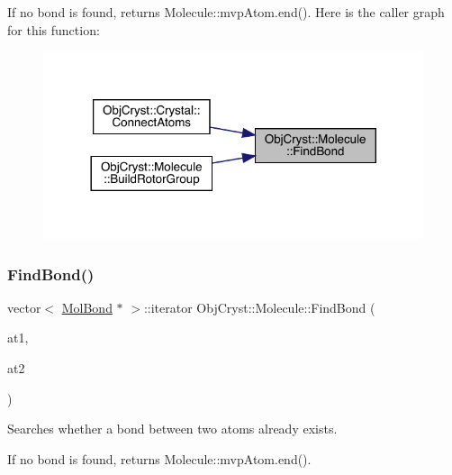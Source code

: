 If no bond is found, returns Molecule\+::mvp\+Atom.\+end(). Here is the caller graph for this function\+:
\nopagebreak
\begin{figure}[H]
\begin{center}
\leavevmode
\includegraphics[width=317pt]{class_obj_cryst_1_1_molecule_a78cdfa9c0223f1f45d5aac3b0e0d4989_icgraph}
\end{center}
\end{figure}
\mbox{\label{class_obj_cryst_1_1_molecule_a44ab98d43be98b63297c0059a73e07ad}} 
\subsubsection{\texorpdfstring{FindBond()}{FindBond()}\hspace{0.1cm}{\footnotesize\ttfamily [2/2]}}
{\footnotesize\ttfamily vector$<$ \mbox{\hyperlink{class_obj_cryst_1_1_mol_bond}{Mol\+Bond}} $\ast$ $>$\+::iterator Obj\+Cryst\+::\+Molecule\+::\+Find\+Bond (\begin{DoxyParamCaption}\item[{const \mbox{\hyperlink{class_obj_cryst_1_1_mol_atom}{Mol\+Atom}} \&}]{at1,  }\item[{const \mbox{\hyperlink{class_obj_cryst_1_1_mol_atom}{Mol\+Atom}} \&}]{at2 }\end{DoxyParamCaption})}

Searches whether a bond between two atoms already exists.

If no bond is found, returns Molecule\+::mvp\+Atom.\+end(). \mbox{\label{class_obj_cryst_1_1_molecule_a5a9a7cfad7693ce55fa20be38f1a92c1}} 
